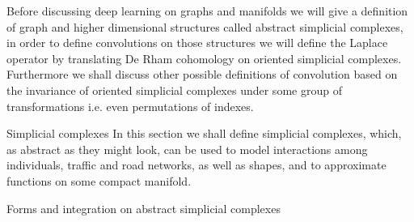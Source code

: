\documentclass[../main.tex]{subfiles}
\begin{document}
    Before discussing deep learning on graphs and manifolds we will give a definition of
    graph and higher dimensional structures called abstract simplicial complexes, in order 
    to define convolutions on those structures we will define the Laplace operator by 
    translating De Rham cohomology on oriented simplicial complexes.
    Furthermore we shall discuss other possible definitions of convolution based on the invariance of 
    oriented simplicial complexes under some group of transformations i.e. even permutations
    of indexes.     
    
    \begin{section}{Simplicial complexes}
        In this section we shall define simplicial complexes, which, as abstract as they might look, can 
        be used to model interactions among individuals, traffic and road networks, as well as shapes, and 
        to approximate functions on some compact manifold.
            
    \end{section}
    \begin{section}{Forms and integration on abstract simplicial complexes}
            
    \end{section}
\end{document}
